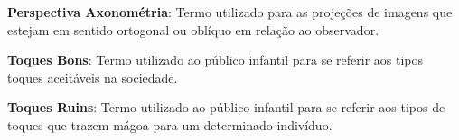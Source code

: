 {\textbf{Perspectiva Axonométria}: Termo utilizado para as projeções de imagens que estejam em sentido ortogonal ou oblíquo em relação ao observador.

\textbf{Toques Bons}: Termo utilizado ao público infantil para se referir aos tipos toques aceitáveis na sociedade. 

\textbf{Toques Ruins}: Termo utilizado ao público infantil para se referir aos tipos de toques que trazem mágoa para um determinado indivíduo. 





} %


